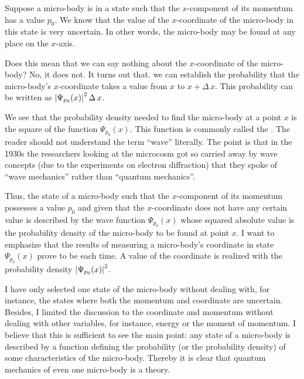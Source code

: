  Suppose a micro-body is in a state such that the $x$-component of its momentum has a value $p_{0}$. We know that the value of the $x$-coordinate of the micro-body in this state is very uncertain. In other words, the micro-body may be found at any place on the $x$-axis.

Does this mean that we can say nothing about the $x$-coordinate of the
micro-body? No, it does not. It turns out that. we can establish the
probability that the micro-body's $x$-coordinate takes a value from $x$ to
$x + \Delta \, x$. This probability can be written as $\abs{\Psi_{p_{0}}  (x)}^{2} \, \Delta \, x$.

We see that the probability density needed to find the micro-body at
a point $x$ is the square of the function $\Psi_{p_{0}}  (x)$. This function is
commonly called the . The reader should not understand the term ``wave'' literally. The point is that in the 1930s the researchers looking at the microcosm got so carried away by wave concepts (due to the experiments on electron diffraction) that they spoke of ``wave 	mechanics'' rather than ``quantum mechanics''.

Thus, the state of a micro-body such that the $x$-component of its
momentum possesses a value $p_{0}$ and given that the $x$-coordinate does not have any certain value is described by the wave function $\Psi_{p_{0}} (x)$ whose squared absolute value is the probability density of the
micro-body to be found at point $x$. I want to emphasize that the results
of measuring a micro-body's coordinate in state $\Psi_{p_{0}} (x)$ prove to be  each time. A value of the coordinate is realized with the
probability density $\abs{\Psi_{p_{0}}  (x)}^{2}$.

I have only selected one state of the micro-body without dealing with,
for instance, the states where both the momentum and coordinate are
uncertain. Besides, I limited the discussion to the coordinate and
momentum without dealing with other variables, for instance, energy or
the moment of momentum. I believe that this is sufficient to see the
main point: any state of a micro-body is described by a function defining
the probability (or the probability density) of some characteristics of the
micro-body. Thereby it is clear that quantum mechanics of even one
micro-body is a  theory.

